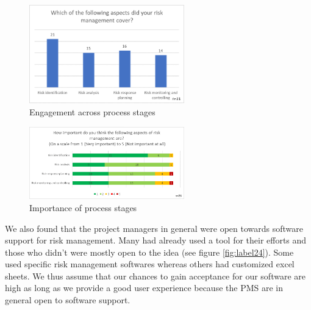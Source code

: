 \begin{figure}[H]
	\centering
	\includegraphics[width=0.6\textwidth]{Assets/survey_results/Q3.png}
	\caption{Engagement across process stages}
	\label{fig:label22}
\end{figure}
\begin{figure}[H]
	\centering
	\includegraphics[width=0.6\textwidth]{Assets/survey_results/Q4.png}
	\caption{Importance of process stages}
	\label{fig:label23}
\end{figure}

We also found that the project managers in general were open towards software support for risk management. Many had already used a tool for their efforts and those who didn't were mostly open to the idea (see figure \ref{fig:label24}). Some used specific risk management softwares whereas others had customized excel sheets. We thus assume that our chances to gain acceptance for our software are high as long as we provide a good user experience because the PMS are in general open to software support.

